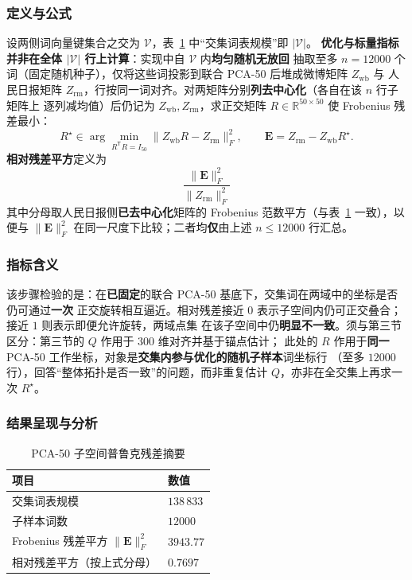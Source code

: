 \documentclass[withoutpreface]{cumcmthesis}
\begin{document}
\subsubsection{定义与公式}
设两侧词向量键集合之交为 $\mathcal{V}$，表~\ref{tab:geom-proc} 中“交集词表规模”即 $|\mathcal{V}|$。
\textbf{优化与标量指标并非在全体 $|\mathcal{V}|$ 行上计算}：实现中自 $\mathcal{V}$ 内\textbf{均匀随机无放回}
抽取至多 $n{=}12000$ 个词（固定随机种子），仅将这些词投影到联合 PCA-50 后堆成微博矩阵 $Z_{\mathrm{wb}}$ 与
人民日报矩阵 $Z_{\mathrm{rm}}$，行按同一词对齐。对两矩阵分别\textbf{列去中心化}（各自在该 $n$ 行子矩阵上
逐列减均值）后仍记为 $Z_{\mathrm{wb}},Z_{\mathrm{rm}}$，求正交矩阵
$R\in\mathbb{R}^{50\times 50}$ 使 Frobenius 残差最小：
\begin{equation}
  R^\star \in \arg\min_{R^{\mathsf{T}}R=I_{50}} \bigl\lVert Z_{\mathrm{wb}}R-Z_{\mathrm{rm}}\bigr\rVert_F^2,\qquad
  \mathbf{E}=Z_{\mathrm{rm}}-Z_{\mathrm{wb}}R^\star .
\end{equation}
\textbf{相对残差平方}定义为 
\begin{equation}
  \frac{\lVert\mathbf{E}\rVert_F^2}{\lVert Z_{\mathrm{rm}}\rVert_F^2}
\end{equation}
其中分母取人民日报侧\textbf{已去中心化}矩阵的 Frobenius 范数平方（与表~\ref{tab:geom-proc} 一致），以便与
$\lVert\mathbf{E}\rVert_F^2$ 在同一尺度下比较；二者均\textbf{仅}由上述 $n\le12000$ 行汇总。

\subsubsection{指标含义}
该步骤检验的是：在\textbf{已固定}的联合 PCA-50 基底下，交集词在两域中的坐标是否仍可通过\textbf{一次}
正交旋转相互逼近。相对残差接近 $0$ 表示子空间内仍可正交叠合；接近 $1$ 则表示即便允许旋转，两域点集
在该子空间中仍\textbf{明显不一致}。须与第三节区分：第三节的 $Q$ 作用于 $300$ 维对齐并基于锚点估计；
此处的 $R$ 作用于\textbf{同一} PCA-50 工作坐标，对象是\textbf{交集内参与优化的随机子样本}词坐标行
（至多 $12000$ 行），回答“整体拓扑是否一致”的问题，而非重复估计 $Q$，亦非在全交集上再求一次
$R^\star$。

\subsubsection{结果呈现与分析}

\begin{table}[htbp]
  \centering
  \caption{PCA-50 子空间普鲁克残差摘要}
  \label{tab:geom-proc}
  \begin{tabular}{@{}ll@{}}
    \toprule
    项目 & 数值 \\
    \midrule
    交集词表规模 & $138\,833$ \\
    子样本词数 & $12000$ \\
    Frobenius 残差平方 $\lVert\mathbf{E}\rVert_F^2$ & $3943.77$ \\
    相对残差平方（按上式分母） & $0.7697$ \\
    \bottomrule
  \end{tabular}
\end{table}
\end{document}
